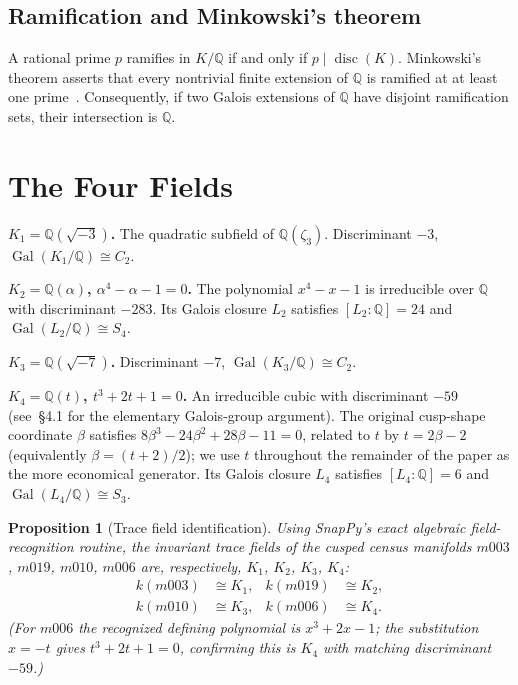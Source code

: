 \documentclass[12pt]{amsart}
\newtheorem{proposition}[theorem]{Proposition}
\DeclareMathOperator{\Gal}{Gal}
\DeclareMathOperator{\disc}{disc}
\newcommand{\Q}{\mathbb{Q}}
\begin{document}
\subsection{Ramification and Minkowski's theorem}
A rational prime $p$ ramifies in $K/\Q$ if and only if $p\mid\disc(K)$.
Minkowski's theorem asserts that every nontrivial finite extension of $\Q$
is ramified at at least one prime~\cite[Theorem~2.17]{Neukirch}.
Consequently, if two Galois extensions of $\Q$ have disjoint ramification
sets, their intersection is $\Q$.

\section{The Four Fields}\label{sec:fields}

\textbf{$K_1=\Q(\sqrt{-3})$.} The quadratic subfield of $\Q(\zeta_3)$.
Discriminant $-3$, $\Gal(K_1/\Q)\cong C_2$.

\textbf{$K_2=\Q(\alpha)$, $\alpha^4-\alpha-1=0$.} The polynomial
$x^4-x-1$ is irreducible over $\Q$ with discriminant $-283$. Its Galois
closure $L_2$ satisfies $[L_2:\Q]=24$ and $\Gal(L_2/\Q)\cong S_4$.

\textbf{$K_3=\Q(\sqrt{-7})$.} Discriminant $-7$, $\Gal(K_3/\Q)\cong C_2$.

\textbf{$K_4=\Q(t)$, $t^3+2t+1=0$.} An irreducible cubic with
discriminant $-59$ (see~\S4.1 for the elementary Galois-group argument).
The original cusp-shape coordinate $\beta$ satisfies
$8\beta^3-24\beta^2+28\beta-11=0$, related to $t$ by $t=2\beta-2$
(equivalently $\beta=(t+2)/2$); we use $t$ throughout the remainder of
the paper as the more economical generator. Its Galois closure $L_4$
satisfies $[L_4:\Q]=6$ and $\Gal(L_4/\Q)\cong S_3$.

\begin{proposition}[Trace field identification]\label{prop:manifolds}
Using SnapPy's exact algebraic field-recognition routine, the invariant
trace fields of the cusped census manifolds $m003$, $m019$,
$m010$, $m006$ are, respectively, $K_1$, $K_2$, $K_3$, $K_4$:
\begin{align*}
k(m003)&\cong K_1, & k(m019)&\cong K_2,\\
k(m010)&\cong K_3, & k(m006)&\cong K_4.
\end{align*}
(For $m006$ the recognized defining polynomial is $x^3+2x-1$; the
substitution $x=-t$ gives $t^3+2t+1=0$, confirming this is $K_4$ with
matching discriminant $-59$.)
\end{proposition}
\end{document}
